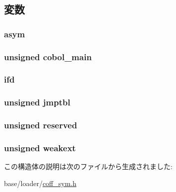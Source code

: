 \subsection{変数}
\hypertarget{structecoff__extsym_a7c232c9306e35bcd917dc8676b3e2f61}{
\subsubsection[{asym}]{ {\bf asym}}}
\label{structecoff__extsym_a7c232c9306e35bcd917dc8676b3e2f61}
\hypertarget{structecoff__extsym_aaed39a4650f1de8c2c6531eb0be9aada}{
\subsubsection[{cobol\_\-main}]{\setlength{\rightskip}{0pt plus 5cm}unsigned {\bf cobol\_\-main}}}
\label{structecoff__extsym_aaed39a4650f1de8c2c6531eb0be9aada}
\hypertarget{structecoff__extsym_af47c2b2ee9314512234a5337b78dc04d}{
\subsubsection[{ifd}]{ {\bf ifd}}}
\label{structecoff__extsym_af47c2b2ee9314512234a5337b78dc04d}
\hypertarget{structecoff__extsym_a8349cfa7ff83bfa4db31aee84ada057d}{
\subsubsection[{jmptbl}]{\setlength{\rightskip}{0pt plus 5cm}unsigned {\bf jmptbl}}}
\label{structecoff__extsym_a8349cfa7ff83bfa4db31aee84ada057d}
\hypertarget{structecoff__extsym_a6a6017ea077b575677a11d733ec137a3}{
\subsubsection[{reserved}]{\setlength{\rightskip}{0pt plus 5cm}unsigned {\bf reserved}}}
\label{structecoff__extsym_a6a6017ea077b575677a11d733ec137a3}
\hypertarget{structecoff__extsym_a096f4abf2deec9cdeffabb29a5c970ae}{
\subsubsection[{weakext}]{\setlength{\rightskip}{0pt plus 5cm}unsigned {\bf weakext}}}
\label{structecoff__extsym_a096f4abf2deec9cdeffabb29a5c970ae}


この構造体の説明は次のファイルから生成されました:\begin{DoxyCompactItemize}
\item 
base/loader/\hyperlink{coff__sym_8h}{coff\_\-sym.h}\end{DoxyCompactItemize}
